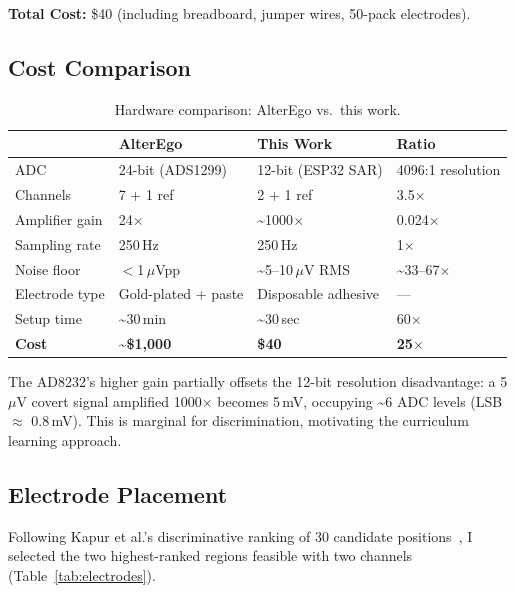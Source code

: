 \documentclass[11pt, a4paper]{article}
\begin{document}
\textbf{Total Cost:} \$40 (including breadboard, jumper wires, 50-pack electrodes).

\subsection{Cost Comparison}

\begin{table}[h]
\centering
\caption{Hardware comparison: AlterEgo vs.\ this work.}
\label{tab:cost}
\begin{tabular}{@{}llll@{}}
\toprule
& AlterEgo~\cite{kapur2018} & This Work & Ratio \\
\midrule
ADC            & 24-bit (ADS1299)       & 12-bit (ESP32 SAR) & 4096:1 resolution \\
Channels       & 7 + 1 ref              & 2 + 1 ref          & 3.5$\times$ \\
Amplifier gain & 24$\times$             & \textasciitilde1000$\times$ & 0.024$\times$ \\
Sampling rate  & 250\,Hz                & 250\,Hz            & 1$\times$ \\
Noise floor    & $<$1\,$\mu$Vpp         & \textasciitilde5--10\,$\mu$V RMS & \textasciitilde33--67$\times$ \\
Electrode type & Gold-plated + paste    & Disposable adhesive & --- \\
Setup time     & \textasciitilde30\,min & \textasciitilde30\,sec & 60$\times$ \\
\textbf{Cost}  & \textbf{\textasciitilde\$1{,}000} & \textbf{\$40} & \textbf{25$\times$} \\
\bottomrule
\end{tabular}
\end{table}

The AD8232's higher gain partially offsets the 12-bit resolution disadvantage: a 5\,$\mu$V covert signal amplified 1000$\times$ becomes 5\,mV, occupying \textasciitilde6 ADC levels (LSB $\approx$ 0.8\,mV). This is marginal for discrimination, motivating the curriculum learning approach.

\subsection{Electrode Placement}

Following Kapur et al.'s discriminative ranking of 30 candidate positions~\cite{kapur2018}, I selected the two highest-ranked regions feasible with two channels (Table~\ref{tab:electrodes}).
\end{document}
